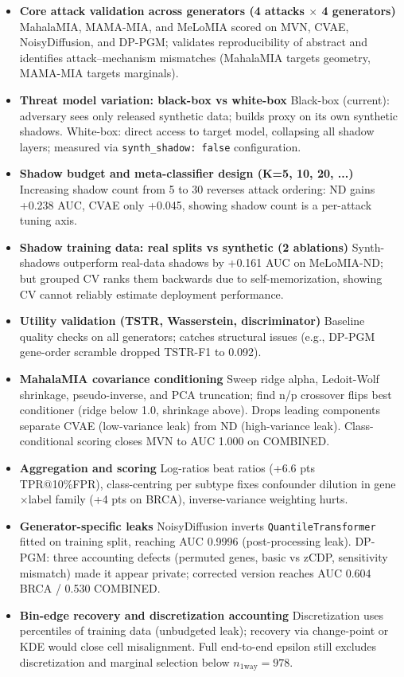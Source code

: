 \documentclass[webpdf,contemporary,large]{oup-authoring-template}%
\theoremstyle{thmstyleone}%
\theoremstyle{thmstyletwo}%
\theoremstyle{thmstylethree}%
\begin{document}
\begin{itemize}
\item \textbf{Core attack validation across generators (4 attacks $\times$ 4 generators)} MahalaMIA, MAMA-MIA, and MeLoMIA scored on MVN, CVAE, NoisyDiffusion, and DP-PGM; validates reproducibility of abstract and identifies attack–mechanism mismatches (MahalaMIA targets geometry, MAMA-MIA targets marginals).
\item \textbf{Threat model variation: black-box vs white-box} Black-box (current): adversary sees only released synthetic data; builds proxy on its own synthetic shadows. White-box: direct access to target model, collapsing all shadow layers; measured via \texttt{synth\_shadow: false} configuration.
\item \textbf{Shadow budget and meta-classifier design (K=5, 10, 20, ...)} Increasing shadow count from 5 to 30 reverses attack ordering: ND gains +0.238 AUC, CVAE only +0.045, showing shadow count is a per-attack tuning axis.
\item \textbf{Shadow training data: real splits vs synthetic (2 ablations)} Synth-shadows outperform real-data shadows by +0.161 AUC on MeLoMIA-ND; but grouped CV ranks them backwards due to self-memorization, showing CV cannot reliably estimate deployment performance.
\item \textbf{Utility validation (TSTR, Wasserstein, discriminator)} Baseline quality checks on all generators; catches structural issues (e.g., DP-PGM gene-order scramble dropped TSTR-F1 to 0.092).
\item \textbf{MahalaMIA covariance conditioning} Sweep ridge alpha, Ledoit-Wolf shrinkage, pseudo-inverse, and PCA truncation; find n/p crossover flips best conditioner (ridge below 1.0, shrinkage above). Drops leading components separate CVAE (low-variance leak) from ND (high-variance leak). Class-conditional scoring closes MVN to AUC 1.000 on COMBINED.
\item \textbf{Aggregation and scoring} Log-ratios beat ratios (+6.6 pts TPR@10\%FPR), class-centring per subtype fixes confounder dilution in gene$\times$label family (+4 pts on BRCA), inverse-variance weighting hurts.
\item \textbf{Generator-specific leaks} NoisyDiffusion inverts \texttt{QuantileTransformer} fitted on training split, reaching AUC 0.9996 (post-processing leak). DP-PGM: three accounting defects (permuted genes, basic vs zCDP, sensitivity mismatch) made it appear private; corrected version reaches AUC 0.604 BRCA / 0.530 COMBINED.
\item \textbf{Bin-edge recovery and discretization accounting} Discretization uses percentiles of training data (unbudgeted leak); recovery via change-point or KDE would close cell misalignment. Full end-to-end epsilon still excludes discretization and marginal selection below $n_{1\text{way}} = 978$.

\end{itemize}
\end{document}
